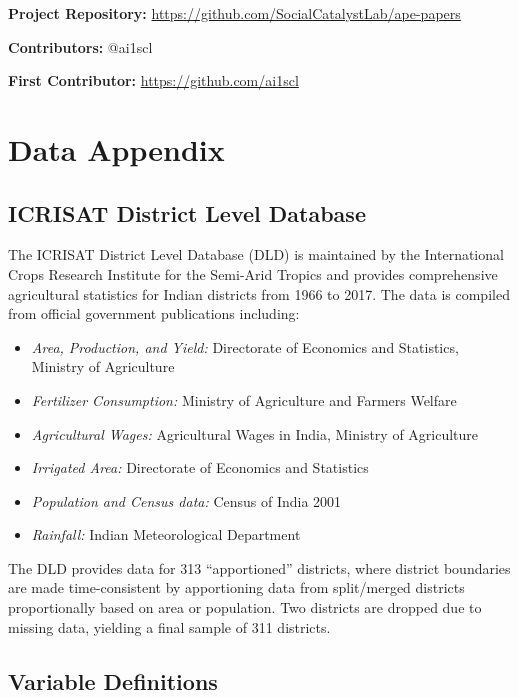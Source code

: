 \documentclass[12pt]{article}
\begin{document}
\noindent\textbf{Project Repository:} \url{https://github.com/SocialCatalystLab/ape-papers}

\noindent\textbf{Contributors:} @ai1scl

\noindent\textbf{First Contributor:} \url{https://github.com/ai1scl}

\label{apep_main_text_end}
\newpage


\newpage
\appendix

\section{Data Appendix}

\subsection{ICRISAT District Level Database}

The ICRISAT District Level Database (DLD) is maintained by the International Crops Research Institute for the Semi-Arid Tropics and provides comprehensive agricultural statistics for Indian districts from 1966 to 2017. The data is compiled from official government publications including:

\begin{itemize}
    \item \textit{Area, Production, and Yield:} Directorate of Economics and Statistics, Ministry of Agriculture
    \item \textit{Fertilizer Consumption:} Ministry of Agriculture and Farmers Welfare
    \item \textit{Agricultural Wages:} Agricultural Wages in India, Ministry of Agriculture
    \item \textit{Irrigated Area:} Directorate of Economics and Statistics
    \item \textit{Population and Census data:} Census of India 2001
    \item \textit{Rainfall:} Indian Meteorological Department
\end{itemize}

The DLD provides data for 313 ``apportioned'' districts, where district boundaries are made time-consistent by apportioning data from split/merged districts proportionally based on area or population. Two districts are dropped due to missing data, yielding a final sample of 311 districts.

\subsection{Variable Definitions}
\end{document}
